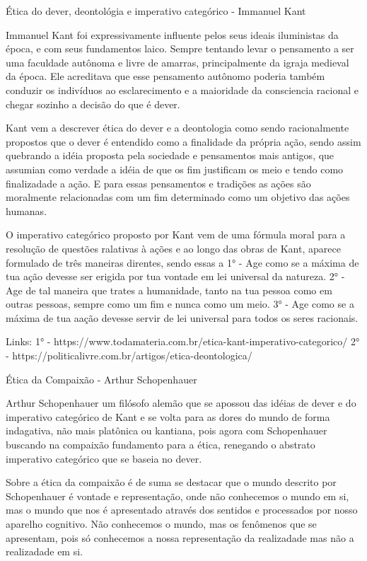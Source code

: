 
Ética do dever, deontológia e imperativo categórico - Immanuel Kant

Immanuel Kant foi expressivamente influente pelos seus ideais iluministas da época, e com seus fundamentos laico. Sempre tentando levar o pensamento a ser uma faculdade autônoma e livre de amarras, principalmente da igraja medieval da época. Ele acreditava que esse pensamento autônomo poderia também conduzir os indivíduos ao esclarecimento e a maioridade da consciencia racional e chegar sozinho a decisão do que é dever.

Kant vem a descrever ética do dever e a deontologia como sendo racionalmente propostos que o dever é entendido como a finalidade da própria ação, sendo assim quebrando a idéia proposta pela sociedade e pensamentos mais antigos, que assumian como verdade a idéia de que os fim justificam os meio e tendo como finalizadade a ação. E para essas pensamentos e tradições as ações são moralmente relacionadas com um fim determinado como um objetivo das ações humanas.

O imperativo categórico proposto por Kant vem de uma fórmula moral para a resolução de questões ralativas à ações e ao longo das obras de Kant, aparece formulado de três maneiras direntes, sendo essas a 1° - Age como se a máxima de tua ação devesse ser erigida por tua vontade em lei universal da natureza. 2° - Age de tal maneira que trates a humanidade, tanto na tua pessoa como em outras pessoas, sempre como um fim e nunca como um meio. 3° - Age como se a máxima de tua aação devesse servir de lei universal para todos os seres racionais.

Links:
1° - https://www.todamateria.com.br/etica-kant-imperativo-categorico/
2° - https://politicalivre.com.br/artigos/etica-deontologica/

Ética da Compaixão - Arthur Schopenhauer

Arthur Schopenhauer um filósofo alemão que se apossou das idéias de dever e do imperativo categórico de Kant e se volta para as dores do mundo de forma indagativa, não mais platônica ou kantiana, pois agora com Schopenhauer buscando na compaixão fundamento para a ética, renegando o abstrato imperativo categórico que se baseia no dever.

Sobre a ética da compaixão é de suma se destacar que o mundo descrito por Schopenhauer é vontade e representação, onde não conhecemos o mundo em si, mas o mundo que nos é apresentado através dos sentidos e processados por nosso aparelho cognitivo. Não conhecemos o mundo, mas os fenômenos que se apresentam, pois só conhecemos a nossa representação da realizadade mas não a realizadade em si.

